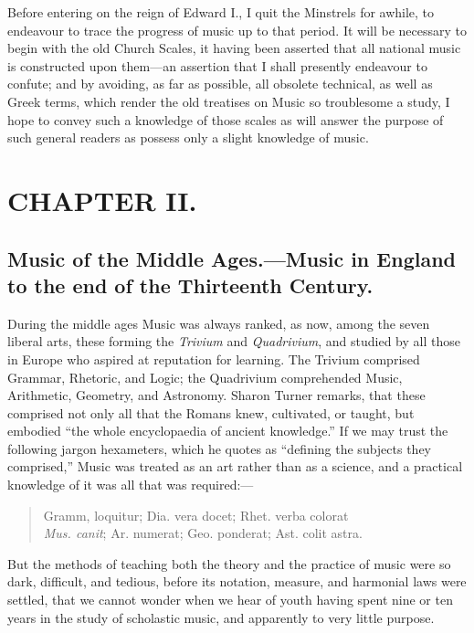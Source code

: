 Before entering on the reign of Edward I., I quit the Minstrels for awhile, to
endeavour to trace the progress of music up to that period. It will be necessary
to begin with the old Church Scales, it having been asserted that all national
music is constructed upon them—an assertion that I shall presently endeavour
to confute; and by avoiding, as far as possible, all obsolete technical, as well
as Greek terms, which render the old treatises on Music so troublesome a study,
I hope to convey such a knowledge of those scales as will answer the purpose of
such general readers as possess only a slight knowledge of music.

\section*{CHAPTER II.}

\subsection{Music of the Middle Ages.—Music in England to the end of
the Thirteenth Century.}

During the middle ages Music was always ranked, as now, among the seven
liberal arts, these forming the \textit{Trivium} and \textit{Quadrivium}, and studied by all
those in Europe who aspired at reputation for learning. The Trivium comprised
Grammar, Rhetoric, and Logic; the Quadrivium comprehended Music, 
\pagebreak
Arithmetic, Geometry, and Astronomy. Sharon Turner remarks, that these 
comprised not only all that the Romans knew, cultivated, or taught, but
embodied “the whole encyclopaedia of ancient knowledge.” If we may trust
the following jargon hexameters, which he quotes as “defining the subjects
they comprised,” Music was treated as an art rather than as a science, and
a practical knowledge of it was all that was required:—

\renewcommand\versoheader{music of the middle ages.}
\renewcommand\rectoheader{gregorian tones.}
\DFNdouble
{}
\begin{quotation}\small
\noindent Gramm, loquitur; Dia. vera docet; Rhet. verba colorat\\
\textit{Mus. canit}; Ar. numerat; Geo. ponderat; Ast. colit astra.
\end{quotation}

\noindent But the methods of teaching both the theory and the practice of music were so
dark, difficult, and tedious, before its notation, measure, and harmonial laws were
settled, that we cannot wonder when we hear of youth having spent nine or ten
years in the study of scholastic music, and apparently to very little purpose.

